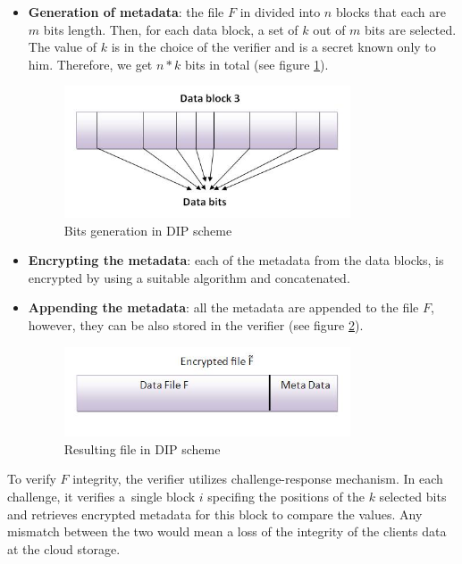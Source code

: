\begin{itemize}
	\item \textbf{Generation of metadata}: the file $F$ in divided into $n$
	blocks that each are $m$ bits length. Then, for each data block, a set of
	$k$ out of $m$ bits are selected. The value of $k$ is in the choice of the
	verifier and is a secret known only to him. Therefore, we get $n*k$ bits in
	total (see figure \ref{fig:dip-step1}).
	\begin{figure}[h!]
		\centering
		\includegraphics[width=0.8\textwidth]{images/dip-step1.png}
		\caption{Bits generation in DIP scheme \cite{dip}}
		\label{fig:dip-step1}
	\end{figure}

	\item \textbf{Encrypting the metadata}: each of the metadata from the data
	blocks, is encrypted by using a suitable algorithm and concatenated.
	\item \textbf{Appending the metadata}: all the metadata are appended to the
	file $F$, however, they can be also stored in the verifier
	(see figure \ref{fig:dip-step2}).
	\begin{figure}[h!]
		\centering
		\includegraphics[width=0.8\textwidth]{images/dip-step2.png}
		\caption{Resulting file in DIP scheme \cite{dip}}
		\label{fig:dip-step2}
	\end{figure}
\end{itemize}

To verify $F$ integrity, the verifier utilizes challenge-response mechanism. In
each challenge, it verifies a~single block $i$ specifing the positions of the
$k$ selected bits and retrieves encrypted metadata for this block to compare
the values. Any mismatch between the two would mean a loss of the integrity of
the clients data at the cloud storage.\\

